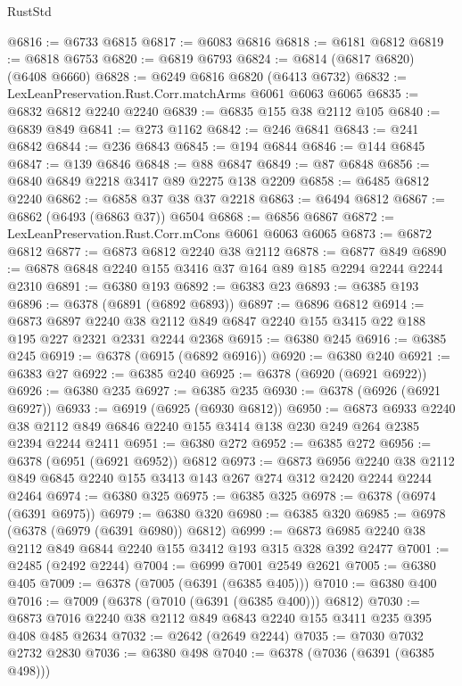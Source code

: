 \begin{lexlean}{RustStd}
\begin{coremodule}
@6816 := @6733 @6815
@6817 := @6083 @6816
@6818 := @6181 @6812
@6819 := @6818 @6753
@6820 := @6819 @6793
@6824 := @6814 (@6817 @6820) (@6408 @6660)
@6828 := @6249 @6816 @6820 (@6413 @6732)
@6832 := LexLeanPreservation.Rust.Corr.matchArms @6061 @6063 @6065
@6835 := @6832 @6812 @2240 @2240
@6839 := @6835 @155 @38 @2112 @105
@6840 := @6839 @849
@6841 := @273 @1162
@6842 := @246 @6841
@6843 := @241 @6842
@6844 := @236 @6843
@6845 := @194 @6844
@6846 := @144 @6845
@6847 := @139 @6846
@6848 := @88 @6847
@6849 := @87 @6848
@6856 := @6840 @6849 @2218 @3417 @89 @2275 @138 @2209
@6858 := @6485 @6812 @2240
@6862 := @6858 @37 @38 @37 @2218
@6863 := @6494 @6812
@6867 := @6862 (@6493 (@6863 @37)) @6504
@6868 := @6856 @6867
@6872 := LexLeanPreservation.Rust.Corr.mCons @6061 @6063 @6065
@6873 := @6872 @6812
@6877 := @6873 @6812 @2240 @38 @2112
@6878 := @6877 @849
@6890 := @6878 @6848 @2240 @155 @3416 @37 @164 @89 @185 @2294 @2244 @2244 @2310
@6891 := @6380 @193
@6892 := @6383 @23
@6893 := @6385 @193
@6896 := @6378 (@6891 (@6892 @6893))
@6897 := @6896 @6812
@6914 := @6873
    @6897
    @2240
    @38
    @2112
    @849
    @6847
    @2240
    @155
    @3415
    @22
    @188
    @195
    @227
    @2321
    @2331
    @2244
    @2368
@6915 := @6380 @245
@6916 := @6385 @245
@6919 := @6378 (@6915 (@6892 @6916))
@6920 := @6380 @240
@6921 := @6383 @27
@6922 := @6385 @240
@6925 := @6378 (@6920 (@6921 @6922))
@6926 := @6380 @235
@6927 := @6385 @235
@6930 := @6378 (@6926 (@6921 @6927))
@6933 := @6919 (@6925 (@6930 @6812))
@6950 := @6873
    @6933
    @2240
    @38
    @2112
    @849
    @6846
    @2240
    @155
    @3414
    @138
    @230
    @249
    @264
    @2385
    @2394
    @2244
    @2411
@6951 := @6380 @272
@6952 := @6385 @272
@6956 := @6378 (@6951 (@6921 @6952)) @6812
@6973 := @6873
    @6956
    @2240
    @38
    @2112
    @849
    @6845
    @2240
    @155
    @3413
    @143
    @267
    @274
    @312
    @2420
    @2244
    @2244
    @2464
@6974 := @6380 @325
@6975 := @6385 @325
@6978 := @6378 (@6974 (@6391 @6975))
@6979 := @6380 @320
@6980 := @6385 @320
@6985 := @6978 (@6378 (@6979 (@6391 @6980)) @6812)
@6999 := @6873 @6985 @2240 @38 @2112 @849 @6844 @2240 @155 @3412 @193 @315 @328 @392 @2477
@7001 := @2485 (@2492 @2244)
@7004 := @6999 @7001 @2549 @2621
@7005 := @6380 @405
@7009 := @6378 (@7005 (@6391 (@6385 @405)))
@7010 := @6380 @400
@7016 := @7009 (@6378 (@7010 (@6391 (@6385 @400))) @6812)
@7030 := @6873 @7016 @2240 @38 @2112 @849 @6843 @2240 @155 @3411 @235 @395 @408 @485 @2634
@7032 := @2642 (@2649 @2244)
@7035 := @7030 @7032 @2732 @2830
@7036 := @6380 @498
@7040 := @6378 (@7036 (@6391 (@6385 @498)))

\end{coremodule}
\end{lexlean}
